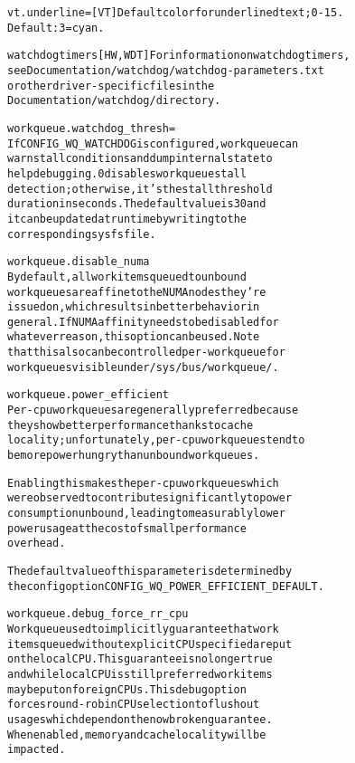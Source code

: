 \documentclass[a4paper,8pt,english]{sphinxmanual}
\begin{document}
\begin{alltt}
        vt.underline=   {[}VT{]} Default color for underlined text; 0-15.
                        Default: 3 = cyan.

        watchdog timers {[}HW,WDT{]} For information on watchdog timers,
                        see Documentation/watchdog/watchdog-parameters.txt
                        or other driver-specific files in the
                        Documentation/watchdog/ directory.

        workqueue.watchdog\_thresh=
                        If CONFIG\_WQ\_WATCHDOG is configured, workqueue can
                        warn stall conditions and dump internal state to
                        help debugging.  0 disables workqueue stall
                        detection; otherwise, it's the stall threshold
                        duration in seconds.  The default value is 30 and
                        it can be updated at runtime by writing to the
                        corresponding sysfs file.

        workqueue.disable\_numa
                        By default, all work items queued to unbound
                        workqueues are affine to the NUMA nodes they're
                        issued on, which results in better behavior in
                        general.  If NUMA affinity needs to be disabled for
                        whatever reason, this option can be used.  Note
                        that this also can be controlled per-workqueue for
                        workqueues visible under /sys/bus/workqueue/.

        workqueue.power\_efficient
                        Per-cpu workqueues are generally preferred because
                        they show better performance thanks to cache
                        locality; unfortunately, per-cpu workqueues tend to
                        be more power hungry than unbound workqueues.

                        Enabling this makes the per-cpu workqueues which
                        were observed to contribute significantly to power
                        consumption unbound, leading to measurably lower
                        power usage at the cost of small performance
                        overhead.

                        The default value of this parameter is determined by
                        the config option CONFIG\_WQ\_POWER\_EFFICIENT\_DEFAULT.

        workqueue.debug\_force\_rr\_cpu
                        Workqueue used to implicitly guarantee that work
                        items queued without explicit CPU specified are put
                        on the local CPU.  This guarantee is no longer true
                        and while local CPU is still preferred work items
                        may be put on foreign CPUs.  This debug option
                        forces round-robin CPU selection to flush out
                        usages which depend on the now broken guarantee.
                        When enabled, memory and cache locality will be
                        impacted.


\end{alltt}
\end{document}
